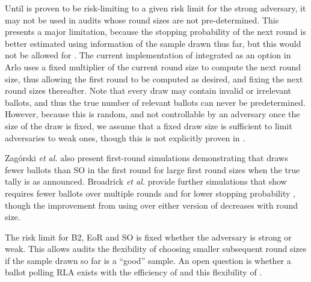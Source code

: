 Until \Minerva is proven to be risk-limiting to a given risk limit for the strong adversary, it may not be used in audits whose round sizes are not pre-determined. This presents a major limitation, because the stopping probability of the next round is better estimated using information of the sample drawn thus far, but this would not be allowed for \Minerva. The current implementation of \Minerva integrated as an option in Arlo uses a fixed multiplier of the current round size to compute the next round size, thus allowing the first round to be computed as desired, and fixing the next round sizes thereafter. Note that every draw may contain invalid or irrelevant ballots, and thus the true number of relevant ballots can never be predetermined. However, because this is random, and not controllable by an adversary once the size of the draw is fixed, we assume that a fixed draw size is sufficient to limit adversaries to weak ones, though this is not explicitly proven in \cite{usenix_minerva}. 


Zag\'{o}rski {\em et al.}  also present first-round simulations demonstrating that \Minerva draws fewer ballots than SO \BRAVO in the first round for large first round sizes when the true tally is as announced. 
Broadrick {\em et al.} provide further simulations that show \Minerva requires fewer ballots over multiple rounds and for lower stopping probability \cite{simulations}, though the improvement from using \Minerva over either version of \BRAVO decreases with round size. 

The risk limit for B2, EoR and SO \BRAVO is fixed whether the adversary is strong or weak. This allows \BRAVO audits the flexibility of choosing smaller subsequent round sizes if the sample drawn so far is a ``good'' sample. An open question is whether a ballot polling RLA exists with the efficiency of \Minerva and this flexibility of \BRAVO.

